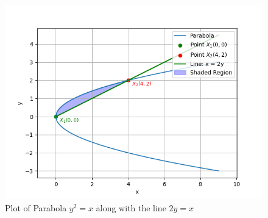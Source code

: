 \documentclass[journal]{IEEEtran}
\begin{document}
\begin{figure}[h]
    \centering
    \includegraphics[width=\columnwidth]{figs/fig.png}
    \caption{Plot of Parabola $y^2 = x$ along with the line $2y = x$}
 \end{figure}
\end{document}
